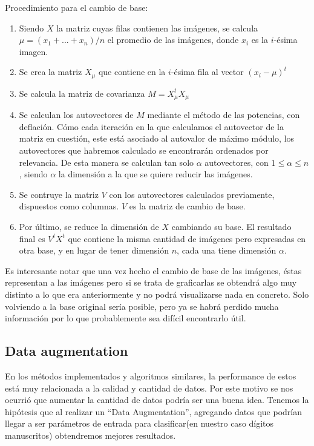 \bigskip

Procedimiento para el cambio de base:

\begin{enumerate}
\item Siendo $X$ la matriz cuyas filas contienen las imágenes, se calcula $\mu = (x_1 + ... + x_n)/n$ el promedio de las imágenes, donde $x_i$ es la $i$-ésima imagen.
\item Se crea la matriz $X_\mu$ que contiene en la $i$-ésima fila al vector $(x_i - \mu)^t$
\item Se calcula la matriz de covarianza $M = X_\mu^tX_\mu$
\item Se calculan los autovectores de $M$ mediante el método de las potencias, con deflación. Cómo cada iteración en la que calculamos el autovector de la matriz en cuestión, este está asociado al autovalor de máximo módulo, los autovectores que habremos calculado se encontrarán ordenados por relevancia. De esta manera se calculan tan solo $\alpha$ autovectores, con $1 \leq \alpha \leq n$, siendo $\alpha$ la dimensión a la que se quiere reducir las imágenes. 
\item Se contruye la matriz $V$ con los autovectores calculados previamente, dispuestos como columnas. $V$ es la matriz de cambio de base.
\item Por último, se reduce la dimensión de $X$ cambiando su base. El resultado final es $V^tX^t$ que contiene la misma cantidad de imágenes pero expresadas en otra base, y en lugar de tener dimensión $n$, cada una tiene dimensión $\alpha$.
\end{enumerate}\tabularnewline

Es interesante notar que una vez hecho el cambio de base de las imágenes, éstas representan a las imágenes pero si se trata de graficarlas se obtendrá algo muy distinto a lo que era anteriormente y no podrá visualizarse nada en concreto. Solo volviendo a la base original sería posible, pero ya se habrá perdido mucha información por lo que probablemente sea difícil encontrarlo útil.

\subsection{Data augmentation}

En los métodos implementados y algoritmos similares, la performance de estos está muy relacionada a la calidad y cantidad de datos. Por este motivo se nos ocurrió que aumentar la cantidad de datos podría ser una buena idea. Tenemos la hipótesis que al realizar un “Data Augmentation”, agregando datos que podrían llegar a ser parámetros de entrada para clasificar(en nuestro caso dígitos manuscritos) obtendremos mejores resultados.

